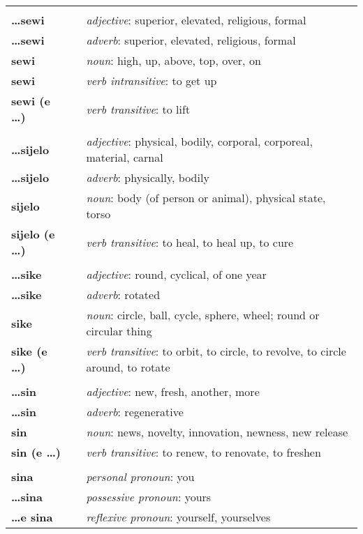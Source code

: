 \begin{supertabular}{p{2,5cm}|ll}
 && \\ %
\textbf{\dots sewi} && \textit{adjective}: superior, elevated, religious, formal \\ 
\textbf{\dots sewi} && \textit{adverb}: superior, elevated, religious, formal \\ 
\textbf{sewi} && \textit{noun}: high, up, above, top, over, on \\ 
\textbf{sewi} && \textit{verb intransitive}: to get up \\ 
\textbf{sewi (e \dots)} && \textit{verb transitive}: to lift \\ 
 && \\ %
\textbf{\dots sijelo} && \textit{adjective}: physical, bodily, corporal, corporeal, material, carnal \\ 
\textbf{\dots sijelo} && \textit{adverb}: physically, bodily \\ 
\textbf{sijelo} && \textit{noun}: body (of person or animal), physical state, torso \\ 
\textbf{sijelo (e \dots)} && \textit{verb transitive}: to heal, to heal up, to cure \\ 
 && \\ %
\textbf{\dots sike} && \textit{adjective}: round, cyclical, of one year \\ 
\textbf{\dots sike} && \textit{adverb}: rotated \\ 
\textbf{sike} && \textit{noun}: circle, ball, cycle, sphere, wheel; round or circular thing \\ 
\textbf{sike (e \dots)} && \textit{verb transitive}: to orbit, to circle, to revolve, to circle around, to rotate \\ 
 && \\ %
\textbf{\dots sin} && \textit{adjective}: new, fresh, another, more \\ 
\textbf{ \dots sin } && \textit{adverb}: regenerative \\ 
\textbf{sin} && \textit{noun}: news, novelty, innovation, newness, new release \\ 
\textbf{sin (e \dots)} && \textit{verb transitive}: to renew, to renovate, to freshen \\ 
 && \\ %
\textbf{sina} && \textit{personal pronoun}: you \\ 
\textbf{\dots sina} && \textit{possessive pronoun}: yours \\  
\textbf{\dots e sina} && \textit{reflexive pronoun}: yourself, yourselves \\  

\end{supertabular}
